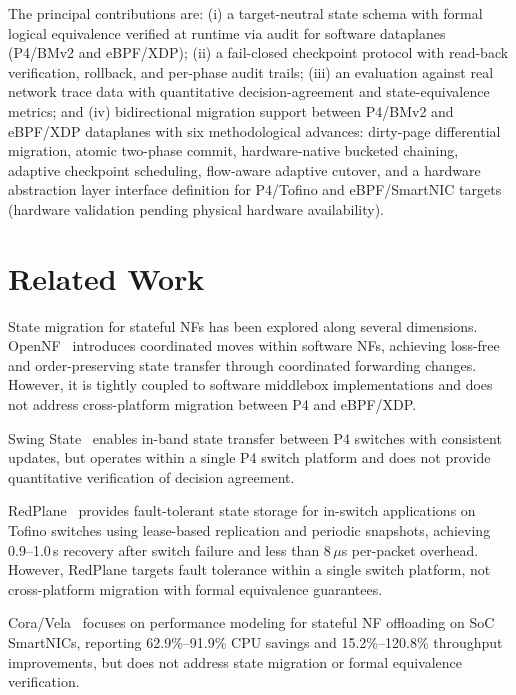 \documentclass[10pt, conference, compsoc]{IEEEtran}
\begin{document}
The principal contributions are: (i) a target-neutral state schema with formal
logical equivalence verified at runtime via audit for software dataplanes
(P4/BMv2 and eBPF/XDP); (ii) a fail-closed checkpoint protocol with read-back
verification, rollback, and per-phase audit trails; (iii) an evaluation against
real network trace data with quantitative decision-agreement and
state-equivalence metrics; and (iv) bidirectional migration support between
P4/BMv2 and eBPF/XDP dataplanes with six methodological advances: dirty-page
differential migration, atomic two-phase commit, hardware-native bucketed
chaining, adaptive checkpoint scheduling, flow-aware adaptive cutover, and a
hardware abstraction layer interface definition for P4/Tofino and eBPF/SmartNIC
targets (hardware validation pending physical hardware availability).

\section{Related Work}
\label{sec:related_work}

State migration for stateful NFs has been explored along several dimensions.
OpenNF~\cite{gember2014opennf} introduces coordinated moves within software NFs,
achieving loss-free and order-preserving state transfer through coordinated
forwarding changes. However, it is tightly coupled to software middlebox
implementations and does not address cross-platform migration between P4 and
eBPF/XDP.

Swing State~\cite{luo2017swing} enables in-band state transfer between P4
switches with consistent updates, but operates within a single P4 switch
platform and does not provide quantitative verification of decision agreement.

RedPlane~\cite{kim2021redplane} provides fault-tolerant state storage for
in-switch applications on Tofino switches using lease-based replication and
periodic snapshots, achieving 0.9--1.0\,s recovery after switch failure and less
than 8\,$\mu$s per-packet overhead. However, RedPlane targets fault tolerance
within a single switch platform, not cross-platform migration with formal
equivalence guarantees.

Cora/Vela~\cite{xi2024cora} focuses on performance modeling for stateful NF
offloading on SoC SmartNICs, reporting 62.9\%--91.9\% CPU savings and 15.2\%--120.8\%
throughput improvements, but does not address state migration or formal
equivalence verification.
\end{document}
